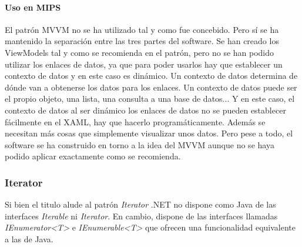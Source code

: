 \paragraph{Uso en MIPS}
El patr\'on MVVM no se ha utilizado tal y como fue concebido. Pero s\'i se ha mantenido la separaci\'on entre
las tres partes del software. Se han creado los ViewModels tal y como se recomienda en el patr\'on, pero no
se han podido utilizar los enlaces de datos, ya que para poder usarlos hay que establecer un contexto de datos
y en este caso es din\'amico. Un contexto de datos determina de d\'onde van a obtenerse los datos para
los enlaces. Un contexto de datos puede ser el propio objeto, una lista, una consulta a una base de datos...
Y en este caso, el contexto de datos al ser din\'amico los enlaces de datos no se pueden 
establecer f\'acilmente en el XAML, hay que hacerlo
program\'aticamente. Adem\'as se necesitan m\'as cosas que simplemente visualizar unos datos. Pero
pese a todo, el software se ha construido en torno a la idea del MVVM aunque no se haya podido aplicar exactamente
como se recomienda.

\subsubsection{Iterator}
Si bien el titulo alude al patr\'{o}n \emph{Iterator} .NET no dispone como Java de las interfaces \emph{Iterable} ni
\emph{Iterator}.
En cambio, dispone de las interfaces llamadas \emph{IEnumerator<T>} e \emph{IEnumerable<T>} 
que ofrecen una funcionalidad equivalente a las de Java.

